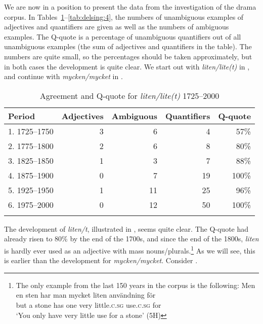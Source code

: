 \documentclass[output=paper]{langscibook}
\begin{document}
We are now in a position to present the data from the investigation of the drama corpus. In Tables~\ref{tab:delsing:3}--\ref{tab:delsing:4}, the numbers of unambiguous examples of adjectives and quantifiers are given as well as the numbers of ambiguous examples. The Q-quote is a percentage of unambiguous quantifiers out of all unambiguous examples (the sum of adjectives and quantifiers in the table). The numbers are quite small, so the percentages should be taken approximately, but in both cases the development is quite clear. We start out with \textit{liten/lite(t)} in , and continue with \textit{mycken/mycket} in .



\begin{table}
\caption{Agreement and Q-quote for \textit{liten/lite(t)} 1725–2000}
\label{tab:delsing:3}
\begin{tabular}{lrrrr}
\lsptoprule
Period & Adjectives & Ambiguous & Quantifiers & Q-quote\\\midrule
1. 1725–1750 & 3 & 6 & 4 & 57\%\\
2. 1775–1800 & 2 & 6 & 8 & 80\%\\
3. 1825–1850 & 1 & 3 & 7 & 88\%\\
4. 1875–1900 & 0 & 7 & 19 & 100\%\\
5. 1925–1950 & 1 & 11 & 25 & 96\%\\
6. 1975–2000 & 0 & 12 & 50 & 100\%\\
\lspbottomrule
\end{tabular}
\end{table}

The development of \textit{liten/t}, illustrated in , seems quite clear. The Q-quote had already risen to 80\% by the end of the 1700s, and since the end of the 1800s, \textit{liten} is hardly ever used as an adjective with mass nouns/plurals.\footnote{The only example from the last 150 years in the corpus is the following:
\ea \gll  Men     en     sten     har   man   mycket   liten       användning   för\\
          but     a     stone   has   one   very     little\textsc{.c.sg}   use\textsc{.c.sg}     for\\
     \glt ‘You only have very little use for a stone’ (5H)\z%
} As we will see, this is earlier than the development for \textit{mycken/mycket}. Consider .
\end{document}
